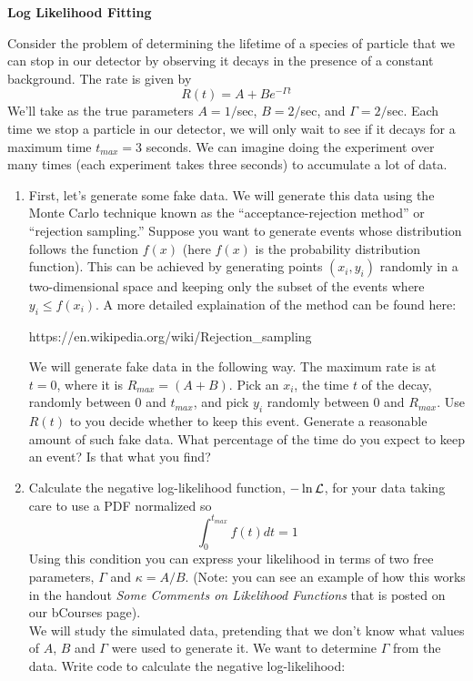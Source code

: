 \documentclass[12pt]{article}
\begin{document}
\begin{center}
{\large\bf Log Likelihood Fitting
}
\end{center}
\vskip0.2in
Consider the problem of determining the lifetime of a species 
of particle that we can stop in our detector
by observing it decays in the presence of a constant background. The rate is
given by
$$
R(t) = A + Be^{-\Gamma t}
$$
We'll take as the true parameters $A=1/$sec, $B=2/$sec, and $\Gamma=2/$sec.
Each time we stop a particle in our detector, we will only wait to see
if it decays for a maximum time $t_{max}=3$ seconds.
We can imagine doing the experiment over many times (each experiment takes 
three seconds) to accumulate a lot of data. 
\begin{enumerate}
\item First, let's generate some fake data. 
We will generate this data using the Monte Carlo technique known 
as the ``acceptance-rejection method'' or  ``rejection sampling.''
Suppose you want to generate events whose distribution follows the
function $f(x)$ (here $f(x)$ is the probability distribution function).
This can be achieved by generating
points $(x_i,y_i)$
randomly in a two-dimensional space and keeping only the
subset of the events where $y_i\le f(x_i)$.  A more detailed
explaination of the method can be found here:
\begin{flushleft}
https://en.wikipedia.org/wiki/Rejection\_sampling
\end{flushleft}
We will generate fake data in the following way.  
The maximum rate is at $t=0$, where it is $R_{max}=(A+B)$.  
Pick an $x_i$, the time $t$ of the decay, randomly 
between 0 and $t_{max}$, and pick $y_i$ randomly between 0 and $R_{max}$.
Use $R(t)$  to you decide whether to keep this event.
Generate a reasonable amount of such fake data.
What percentage of the time do you
expect to keep an event? Is that what you find?
\item  Calculate the negative log-likelihood function, $-\ln {\cal L}$,
for your data taking care to use a PDF normalized so
$$
\int_0^{t_{max}}f(t)dt=1
$$
Using this condition you can express your likelihood in terms of two 
free parameters, $\Gamma$ and $\kappa=A/B$.  (Note:  you can
see an example of how this works in the handout {\it Some
Comments on Likelihood Functions} that is posted on our bCourses
page).\\
We will study the simulated data, pretending that we don't know what 
values of $A$, $B$ and $\Gamma$ were used to generate it.  We want
to determine $\Gamma$ from the data.
Write code to calculate the negative log-likelihood:

\end{enumerate}
\end{document}
